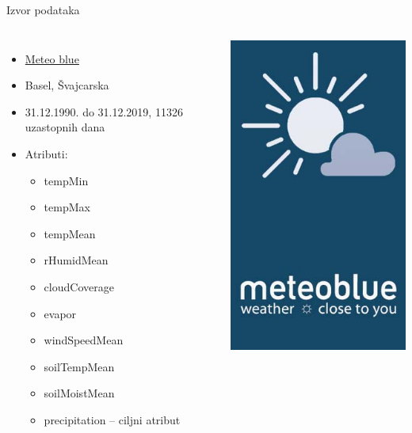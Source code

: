 \documentclass{beamer}
\begin{document}
\begin{frame}{Izvor podataka}
    \begin{columns}
			\begin{itemize}
                \item \href{https://www.meteoblue.com/en/weather/archive/export/basel_switzerland_2661604}{Meteo blue} 
                \item Basel, Švajcarska
                \item 31.12.1990. do 31.12.2019, 11326 uzastopnih dana
                \item Atributi:
                    \begin{itemize}
                        \item tempMin
                        \item tempMax
                        \item tempMean
                        \item rHumidMean
                        \item cloudCoverage
                        \item evapor
                        \item windSpeedMean
                        \item soilTempMean
                        \item soilMoistMean
                        \item precipitation -- ciljni atribut
                    \end{itemize}
            \end{itemize}
		
			\includegraphics[scale=0.4]{presentation/1_meteoblue.jpg}
	\end{columns}
    
\end{frame}
\end{document}
